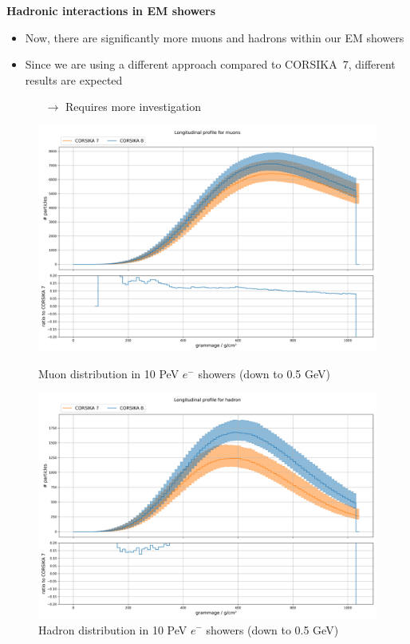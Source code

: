 \documentclass[aspectratio=1610, 9pt]{beamer}
\begin{document}
\begin{frame}
\textbf{Hadronic interactions in EM showers}

  \begin{itemize}
    \item Now, there are significantly more muons and hadrons within our EM showers
    \item Since we are using a different approach compared to CORSIKA~7, different results are expected
    \begin{itemize}
      \item[$\rightarrow$] Requires more investigation
    \end{itemize}
  \end{itemize}

  \begin{figure}[!htb]
      \includegraphics[width=0.95\linewidth]{plots/long_muons.png}
      \caption*{Muon distribution in 10 PeV $e^-$ showers (down to 0.5 GeV)}
    \endminipage%
      \includegraphics[width=0.95\linewidth]{plots/long_hadron.png}
      \caption*{Hadron distribution in 10 PeV $e^-$ showers (down to 0.5 GeV)}
    \endminipage
  \end{figure}
  \vspace{-0.3cm}
\end{frame}
\end{document}
